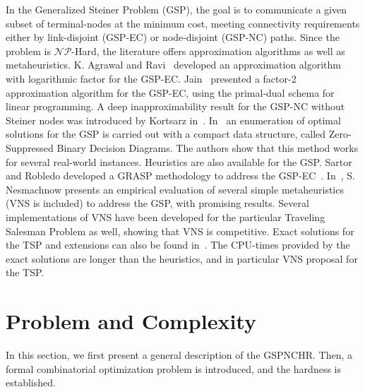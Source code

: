 \documentclass{llncs}
\begin{document}
In the Generalized Steiner Problem (GSP), the goal is to communicate a given subset of terminal-nodes at the minimum cost, 
meeting connectivity requirements either by link-disjoint (GSP-EC) or node-disjoint (GSP-NC) paths. 
Since the problem is $\mathcal{NP}$-Hard, the literature offers approximation algorithms as well as metaheuristics. 
K. Agrawal and Ravi~\cite{32} developed an approximation algorithm with logarithmic factor for the GSP-EC. 
Jain~\cite{33} presented a factor-2 approximation algorithm for the GSP-EC, 
using the primal-dual schema for linear programming. 
A deep inapproximability result for the GSP-NC without Steiner nodes was introduced by Kortsarz in~\cite{34}. 
In~\cite{99} an enumeration of optimal solutions for the GSP is carried out with a compact data structure, called 
Zero-Suppressed Binary Decision Diagrams. The authors show that this method works for several real-world 
instances. Heuristics are also available for the GSP. Sartor and Robledo developed a GRASP methodology to address the 
GSP-EC~\cite{65}. In~\cite{67}, S. Nesmachnow presents an empirical evaluation of several simple metaheuristics (VNS is included) to address the GSP, with promising results. 
Several implementations of VNS have been developed for the particular Traveling Salesman Problem as well, showing that VNS is competitive. Exact solutions for the TSP and extensions can also be found in~\cite{61}. 
The CPU-times provided by the exact solutions are longer than the heuristics, and in particular VNS proposal for the TSP.

\section{Problem and Complexity}\label{problem}
In this section, we first present a general description of the GSPNCHR. Then, a formal combinatorial optimization problem is introduced, and the hardness is established.
\end{document}
